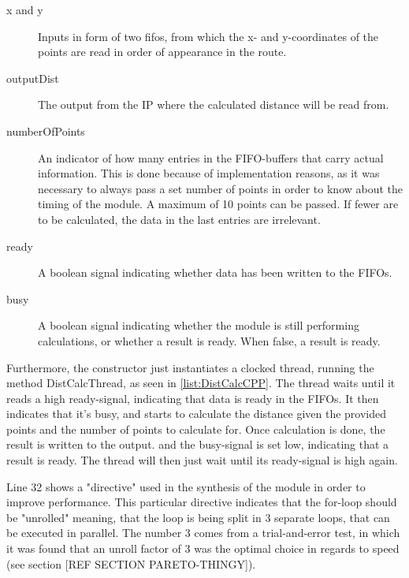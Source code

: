 \begin{description}
	\item[x and y] Inputs in form of two fifos, from which the x- and y-coordinates of the points are read in order of appearance in the route.
	\item[outputDist] The output from the IP where the calculated distance will be read from.
	\item[numberOfPoints] An indicator of how many entries in the FIFO-buffers that carry actual information. This is done because of implementation reasons, as it was necessary to always pass a set number of points in order to know about the timing of the module. A maximum of 10 points can be passed. If fewer are to be calculated, the data in the last entries are irrelevant.	
	\item [ready] A boolean signal indicating whether data has been written to the FIFOs.
	\item [busy] A boolean signal indicating whether the module is still performing calculations, or whether a result is ready. When false, a result is ready.
\end{description}
Furthermore, the constructor just instantiates a clocked thread, running the method DistCalcThread, as seen in \cref{list:DistCalcCPP}. The thread waits until it reads a high ready-signal, indicating that data is ready in the FIFOs. It then indicates that it's busy, and starts to calculate the distance given the provided points and the number of points to calculate for. Once calculation is done, the result is written to the output. and the busy-signal is set low, indicating that a result is ready. The thread will then just wait until its ready-signal is high again.

Line 32 shows a "directive" used in the synthesis of the module in order to improve performance. This particular directive indicates that the for-loop should be "unrolled" meaning, that the loop is being split in 3 separate loops, that can be executed in parallel. The number 3 comes from a trial-and-error test, in which it was found that an unroll factor of 3 was the optimal choice in regards to speed (see section [REF SECTION PARETO-THINGY]).






